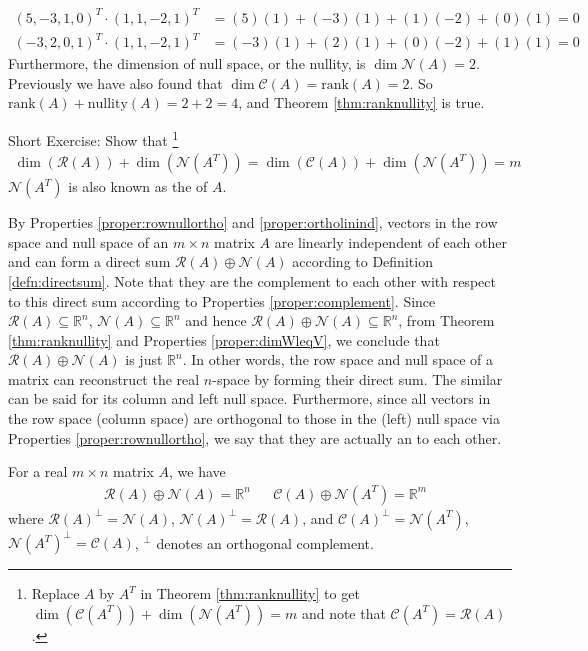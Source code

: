 \begin{solution}
\begin{align*}
(5,-3,1,0)^T \cdot (1,1,-2,1)^T &= (5)(1)+(-3)(1)+(1)(-2)+(0)(1) = 0 \\
(-3,2,0,1)^T \cdot (1,1,-2,1)^T &= (-3)(1)+(2)(1)+(0)(-2)+(1)(1) = 0
\end{align*}
Furthermore, the dimension of null space, or the nullity, is $\dim{\mathcal{N}(A)} = 2$. Previously we have also found that $\dim{\mathcal{C}(A)} = \text{rank}(A) = 2$. So $\text{rank}(A) + \text{nullity}(A) = 2+2 = 4$, and Theorem \ref{thm:ranknullity} is true.
\end{solution}
Short Exercise: Show that \footnote{Replace $A$ by $A^T$ in Theorem \ref{thm:ranknullity} to get $\dim(\mathcal{C}(A^T)) + \dim(\mathcal{N}(A^T)) = m$ and note that $\mathcal{C}(A^T) = \mathcal{R}(A)$.}
\begin{align*}
\dim(\mathcal{R}(A)) + \dim(\mathcal{N}(A^T)) = \dim(\mathcal{C}(A)) + \dim(\mathcal{N}(A^T)) = m   
\end{align*} $\mathcal{N}(A^T)$ is also known as the  of $A$.

By Properties \ref{proper:rownullortho} and \ref{proper:ortholinind}, vectors in the row space and null space of an $m \times n$ matrix $A$ are linearly independent of each other and can form a direct sum $\mathcal{R}(A) \oplus \mathcal{N}(A)$ according to Definition \ref{defn:directsum}. Note that they are the complement to each other with respect to this direct sum according to Properties \ref{proper:complement}. Since $\mathcal{R}(A) \subseteq \mathbb{R}^n$, $\mathcal{N}(A) \subseteq \mathbb{R}^n$ and hence $\mathcal{R}(A) \oplus \mathcal{N}(A) \subseteq \mathbb{R}^n$, from Theorem \ref{thm:ranknullity} and Properties \ref{proper:dimWleqV}, we conclude that $\mathcal{R}(A) \oplus \mathcal{N}(A)$ is just $\mathbb{R}^n$. In other words, the row space and null space of a matrix can reconstruct the real $n$-space by forming their direct sum. The similar can be said for its column and left null space. Furthermore, since all vectors in the row space (column space) are orthogonal to those in the (left) null space via Properties \ref{proper:rownullortho}, we say that they are actually an  to each other.

\begin{proper}
\label{proper:funsubsortho}
For a real $m \times n$ matrix $A$, we have
\begin{align*}
& \mathcal{R}(A) \oplus \mathcal{N}(A) = \mathbb{R}^n & & \mathcal{C}(A) \oplus \mathcal{N}(A^T) = \mathbb{R}^m
\end{align*}
where $\mathcal{R}(A)^\perp = \mathcal{N}(A)$, $\mathcal{N}(A)^\perp = \mathcal{R}(A)$, and $\mathcal{C}(A)^\perp = \mathcal{N}(A^T)$, $\mathcal{N}(A^T)^\perp = \mathcal{C}(A)$, $^\perp$ denotes an orthogonal complement.
\end{proper}

